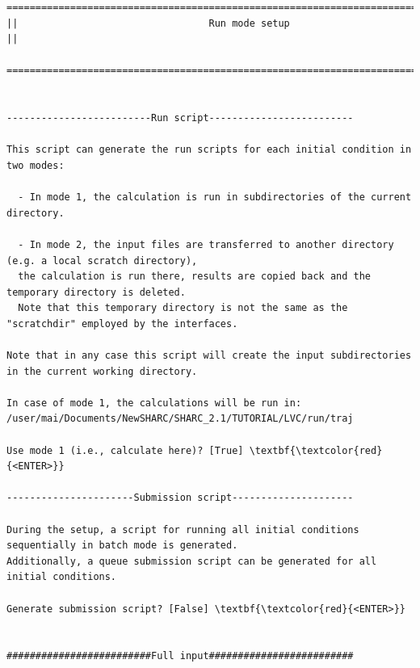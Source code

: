 \documentclass[a4paper,11pt,DIV=15,openany]{scrbook}
\begin{document}
\begin{oframed}
\begin{Verbatim}[commandchars=\\\{\}]
  ================================================================================
||                                 Run mode setup                                 ||
  ================================================================================


-------------------------Run script-------------------------

This script can generate the run scripts for each initial condition in two modes:

  - In mode 1, the calculation is run in subdirectories of the current directory.

  - In mode 2, the input files are transferred to another directory (e.g. a local scratch directory), 
  the calculation is run there, results are copied back and the temporary directory is deleted. 
  Note that this temporary directory is not the same as the "scratchdir" employed by the interfaces.

Note that in any case this script will create the input subdirectories in the current working directory. 

In case of mode 1, the calculations will be run in:
/user/mai/Documents/NewSHARC/SHARC_2.1/TUTORIAL/LVC/run/traj

Use mode 1 (i.e., calculate here)? [True] \textbf{\textcolor{red}{<ENTER>}}

----------------------Submission script---------------------

During the setup, a script for running all initial conditions sequentially in batch mode is generated. 
Additionally, a queue submission script can be generated for all initial conditions.

Generate submission script? [False] \textbf{\textcolor{red}{<ENTER>}}


#########################Full input#########################


\end{Verbatim}
\end{oframed}
\end{document}
